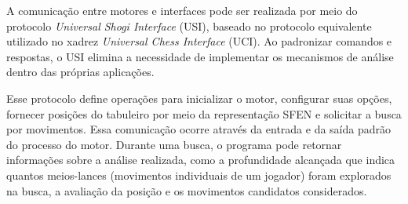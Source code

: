 A comunicação entre motores e interfaces pode ser realizada por meio do protocolo 
\textit{Universal Shogi Interface} (USI), baseado no protocolo equivalente utilizado 
no xadrez \textit{Universal Chess Interface} (UCI). Ao padronizar comandos e respostas, 
o USI elimina a necessidade de implementar os mecanismos de análise dentro das próprias aplicações.

Esse protocolo define operações para inicializar o motor, configurar suas opções, fornecer 
posições do tabuleiro por meio da representação SFEN e solicitar a busca por movimentos. 
Essa comunicação ocorre através da entrada e da saída padrão do processo do motor. Durante 
uma busca, o programa pode retornar informações sobre a análise realizada, como a profundidade 
alcançada que indica quantos meios-lances (movimentos individuais de um jogador) foram explorados 
na busca, a avaliação da posição e os movimentos candidatos considerados. 